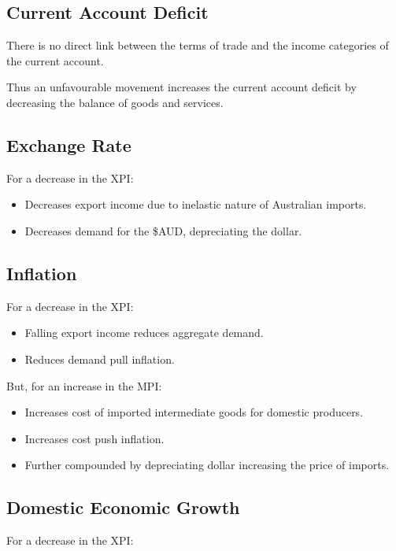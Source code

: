 \documentclass[a4paper,11pt]{report}
\begin{document}
\subsection{Current Account Deficit}

There is no direct link between the terms of trade and the income categories
of the current account.

Thus an unfavourable movement increases the current account deficit by
decreasing the balance of goods and services.

\subsection{Exchange Rate}

For a decrease in the XPI:

\begin{itemize}
\item Decreases export income due to inelastic nature of Australian imports.
\item Decreases demand for the \$AUD, depreciating the dollar.
\end{itemize}

\subsection{Inflation}

For a decrease in the XPI:

\begin{itemize}
\item Falling export income reduces aggregate demand.
\item Reduces demand pull inflation.
\end{itemize}

But, for an increase in the MPI:

\begin{itemize}
\item Increases cost of imported intermediate goods for domestic producers.
\item Increases cost push inflation.
\item Further compounded by depreciating dollar increasing the price of
	imports.
\end{itemize}

\subsection{Domestic Economic Growth}

For a decrease in the XPI:
\end{document}
